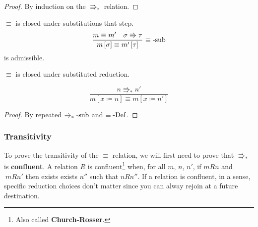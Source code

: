 \begin{proof}
By induction on the $\Rrightarrow_{\ast}$ relation.
\end{proof}
\begin{lem}
$\equiv$ is closed under substitutions that step.
\[
\frac{m\equiv m'\quad\sigma\Rrightarrow\tau}{m\left[\sigma\right]\equiv m'\left[\tau\right]}\,\operatorname{\equiv-sub}
\]
is admissible.
\end{lem}
 
\begin{cor}
$\equiv$ is closed under substituted reduction.
\end{cor}
 
\[
\frac{n\Rrightarrow_{\ast}n'}{m\left[x\coloneqq n\right]\equiv m\left[x\coloneqq n'\right]}
\]
 
\begin{proof}
By repeated $\operatorname{\Rrightarrow_{\ast}-sub}$ and $\equiv\operatorname{-Def}$.
\end{proof}
 
\subsubsection{Transitivity}
 
To prove the transitivity of the $\equiv$ relation, we will first need to prove that \textbf{$\Rrightarrow_{\ast}$ }is \textbf{confluent}.
A relation $R$ is confluent\footnote{
  Also called \textbf{Church-Rosser}.
} when, for all $m$, $n$, $n'$, if $mRn$ and $\:mRn'$ then exists exists $n''$ such that $nRn''$. %
If a relation is confluent, in a sense, specific reduction choices don't matter since you can alway rejoin at a future destination.
 

